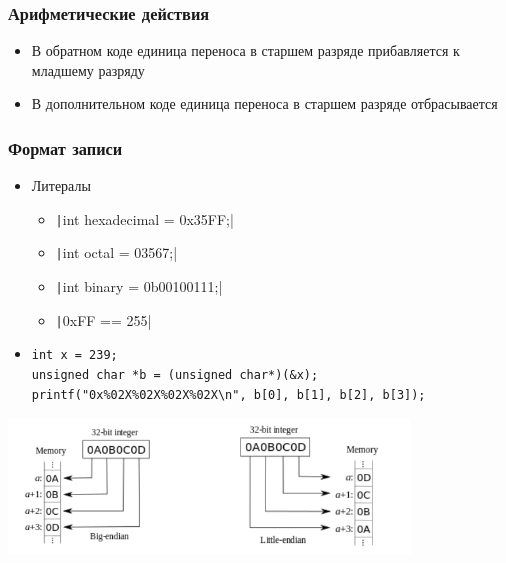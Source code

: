 \documentclass{../../slides-style}
\begin{document}
    \begin{frame}
        \frametitle{Арифметические действия}
        \begin{itemize}
            \item В обратном коде единица переноса в старшем разряде прибавляется к младшему разряду
            \item В дополнительном коде единица переноса в старшем разряде отбрасывается
        \end{itemize}
    \end{frame}

    \begin{frame}[fragile]
        \frametitle{Формат записи}
        \begin{itemize}
            \item Литералы
            \begin{itemize}
                \item \texttt|int hexadecimal = 0x35FF;|
                \item \texttt|int octal = 03567;|
                \item \texttt|int binary = 0b00100111;|
                \item \texttt|0xFF == 255|
            \end{itemize}
            \item 
            \begin{footnotesize}
                \begin{verbatim}
int x = 239;
unsigned char *b = (unsigned char*)(&x);
printf("0x%02X%02X%02X%02X\n", b[0], b[1], b[2], b[3]);
                \end{verbatim}
            \end{footnotesize}
        \end{itemize}
        \begin{center}
            \includegraphics[width=0.8\textwidth]{little-endian-big-endian.png}
        \end{center}
    \end{frame}
\end{document}
